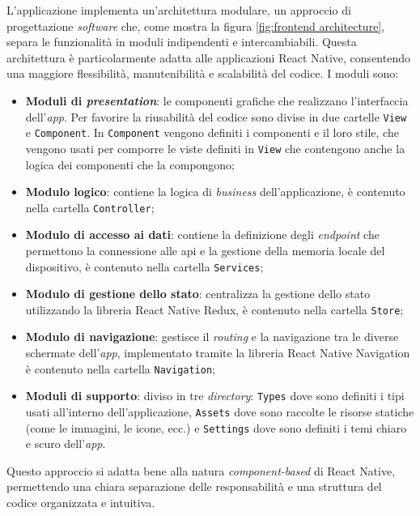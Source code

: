 L'applicazione implementa un'architettura modulare, un approccio di progettazione \textit{software} che, come mostra 
la figura \ref{fig:frontend architecture}, separa le 
funzionalità in moduli indipendenti e intercambiabili. Questa architettura è particolarmente adatta alle applicazioni 
React Native, consentendo una maggiore flessibilità, manutenibilità e scalabilità del codice.
I moduli sono:
\begin{itemize}
      \item \textbf{Moduli di \textit{presentation}}: le componenti grafiche che realizzano l'interfaccia dell'\textit{app}. 
            Per favorire la riusabilità del codice sono divise in due cartelle \texttt{View} e \texttt{Component}. In 
            \texttt{Component} vengono definiti i componenti e il loro stile, che vengono usati per comporre le viste 
            definiti in \texttt{View} che contengono anche la logica dei componenti che la compongono;
      \item \textbf{Modulo logico}: contiene la logica di \textit{business} dell'applicazione, è contenuto nella 
            cartella \texttt{Controller};
      \item \textbf{Modulo di accesso ai dati}: contiene la definizione degli \textit{endpoint} che permettono la 
            connessione alle \gls{api} e la gestione della memoria locale del dispositivo, è contenuto nella cartella 
            \texttt{Services};
      \item \textbf{Modulo di gestione dello stato}: centralizza la gestione dello stato utilizzando 
            la libreria React Native Redux, è contenuto nella cartella \texttt{Store};
      \item \textbf{Modulo di navigazione}: gestisce il \textit{routing} e la navigazione tra le diverse 
            schermate dell'\textit{app}, implementato tramite la libreria React Native Navigation è 
            contenuto nella cartella \texttt{Navigation};
      \item \textbf{Moduli di supporto}: diviso in tre \textit{directory}: \texttt{Types} dove sono 
            definiti i tipi usati all'interno dell'applicazione, \texttt{Assets} dove sono raccolte 
            le risorse statiche (come le immagini, le icone, ecc.) e \texttt{Settings} dove sono definiti 
            i temi chiaro e scuro dell'\textit{app}.
\end{itemize}
Questo approccio si adatta bene alla natura \textit{component-based} di React Native, permettendo una chiara 
separazione delle responsabilità e una struttura del codice organizzata e intuitiva.